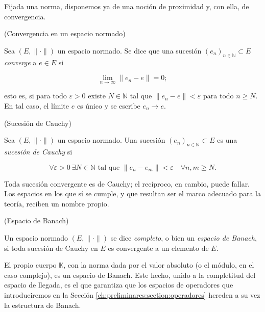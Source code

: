 Fijada una norma, disponemos ya de una noción de proximidad y, con ella, de
convergencia.\\

\begin{Definicion}{(Convergencia en un espacio normado)}
\label{ch:preliminares:def:convergencia}

Sea $(E, \lVert \cdot \rVert)$ un espacio normado. Se dice que una sucesión
$(e_n)_{n \in \mathbb{N}} \subset E$ \textit{converge} a $e \in E$ si

\[\lim_{n \rightarrow \infty} \lVert e_n - e \rVert = 0;\]

esto es, si para todo $\varepsilon > 0$ existe $N \in \mathbb{N}$ tal que
$\lVert e_n - e \rVert < \varepsilon$ para todo $n \geq N$. En tal caso, el
límite $e$ es único y se escribe $e_n \rightarrow e$.
\end{Definicion}

\begin{Definicion}{(Sucesión de Cauchy)}
\label{ch:preliminares:def:cauchy}

Sea $(E, \lVert \cdot \rVert)$ un espacio normado. Una sucesión
$(e_n)_{n \in \mathbb{N}} \subset E$ es una \textit{sucesión de Cauchy} si

\[\forall \varepsilon > 0 \ \exists N \in \mathbb{N} \text{ tal que } \lVert e_n - e_m \rVert < \varepsilon \quad \forall n, m \geq N.\]
\end{Definicion}

Toda sucesión convergente es de Cauchy; el recíproco, en cambio, puede fallar. Los
espacios en los que sí se cumple, y que resultan ser el marco adecuado para la
teoría, reciben un nombre propio.\\

\begin{Definicion}{(Espacio de Banach)}
\label{ch:preliminares:def:banach}

Un espacio normado $(E, \lVert \cdot \rVert)$ se dice \textit{completo}, o bien un
\textit{espacio de Banach}, si toda sucesión de Cauchy en $E$ es convergente a un
elemento de $E$.
\end{Definicion}

\begin{Observacion}
\label{ch:preliminares:obs:KesBanach}
El propio cuerpo $\mathbb{K}$, con la norma dada por el valor absoluto (o el
módulo, en el caso complejo), es un espacio de Banach. Este hecho, unido a la
completitud del espacio de llegada, es el que garantiza que los espacios de
operadores que introduciremos en la Sección
\ref{ch:preliminares:section:operadores} hereden a su vez la estructura de
Banach.
\end{Observacion}


